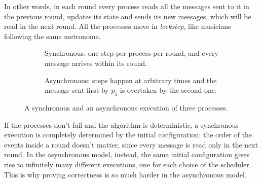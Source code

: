 In other words, in each round every process reads all the messages sent to it in the previous round, updates its state and sends its new messages, which will be read in the next round. All the processes move in \textit{lockstep}, like musicians following the same metronome.

\begin{figure}[H]
  \centering
  \begin{subfigure}{0.48\textwidth}
    \centering
    \caption{Synchronous: one step per process per round, and every message arrives within its round.}
  \end{subfigure}
  \hfill
  \begin{subfigure}{0.48\textwidth}
    \centering
    \caption{Asynchronous: steps happen at arbitrary times and the message sent first by $p_1$ is overtaken by the second one.}
  \end{subfigure}
  \caption{A synchronous and an asynchronous execution of three processes.}
  \label{fig:sync-async}
\end{figure}

\begin{framedobs}{}
  If the processes don't fail and the algorithm is deterministic, a synchronous execution is completely determined by the initial configuration: the order of the events inside a round doesn't matter, since every message is read only in the next round. In the asynchronous model, instead, the same initial configuration gives rise to infinitely many different executions, one for each choice of the scheduler. This is why proving correctness is so much harder in the asynchronous model.
\end{framedobs}

